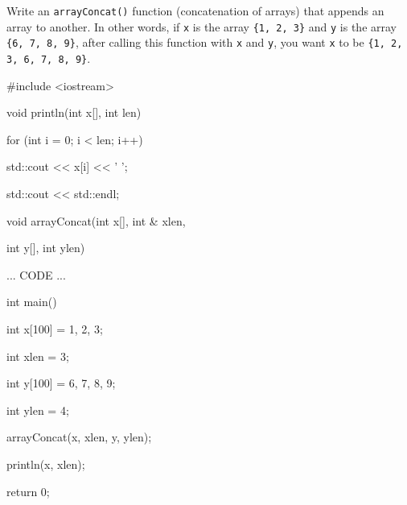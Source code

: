 Write an \texttt{arrayConcat()} function (concatenation of arrays) that appends an array to another. In other words, if \texttt{x} is the array \texttt{\{1, 2, 3\}} and \texttt{y} is the array \texttt{\{6, 7, 8, 9\}}, after calling this function with \texttt{x} and \texttt{y}, you want \texttt{x} to be \texttt{\{1, 2, 3, 6, 7, 8, 9\}}.



\begin{consolethree}[escapeinside=||]

#include <iostream>



void println(int x[], int len)

{

    for (int i = 0; i < len; i++)

    {

        std::cout << x[i] << ' ';

    }

    std::cout << std::endl;

}



void arrayConcat(int x[], int & xlen,

                 int y[], int ylen)

{

    ... CODE ...

}



int main()

{

    int x[100] = {1, 2, 3};

    int xlen = 3;

    int y[100] = {6, 7, 8, 9};

    int ylen = 4;

    arrayConcat(x, xlen, y, ylen);

    println(x, xlen);

    return 0;

}

\end{consolethree}

